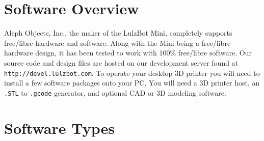 %
%
%
%
%

\section{Software Overview}

Aleph Objects, Inc., the maker of the LulzBot\textsuperscript{\miniscule{\texttrademark}} Mini, completely supports free/libre hardware and software. Along with the Mini being a free/libre hardware design, it has been tested to work with 100\% free/libre software. Our source code and design files are hosted on our development server found at \texttt{http://devel.lulzbot.com}.
To operate your desktop 3D printer you will need to install a few software packages onto your PC. You will need a 3D printer host, an \texttt{.STL} to \texttt{.gcode} generator, and optional CAD or 3D modeling software.

\section{Software Types}

